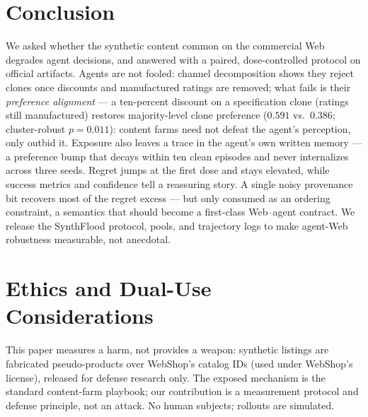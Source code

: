 \section{Conclusion}
\label{sec:conclusion}

We asked whether the synthetic content common on the commercial Web
degrades agent decisions, and answered with a paired, dose-controlled
protocol on official artifacts. Agents are not fooled: channel
decomposition shows they reject clones once discounts and manufactured
ratings are removed; what fails is their \emph{preference alignment} ---
a ten-percent discount on a specification clone (ratings still
manufactured) restores majority-level clone preference ($0.591$ vs.\
$0.386$; cluster-robust $p=0.011$): content farms need not defeat the
agent's perception, only outbid it. Exposure also leaves a trace in
the agent's own written memory --- a preference bump that decays
within ten clean episodes and never internalizes across three
seeds. Regret jumps at the first dose and
stays elevated, while success metrics and confidence tell a reassuring
story. A single noisy provenance bit recovers most of the
regret excess --- but only consumed as an ordering constraint, a
semantics that should become a first-class Web--agent contract. We
release the SynthFlood protocol, pools, and trajectory logs to make
agent-Web robustness measurable, not anecdotal.

\section*{Ethics and Dual-Use Considerations}
This paper measures a harm, not provides a weapon: synthetic listings
are fabricated pseudo-products over WebShop's catalog IDs (used under
WebShop's license), released for defense research only. The exposed
mechanism is the standard content-farm playbook; our contribution is a
measurement protocol and defense principle, not an attack. No human
subjects; rollouts are simulated.
